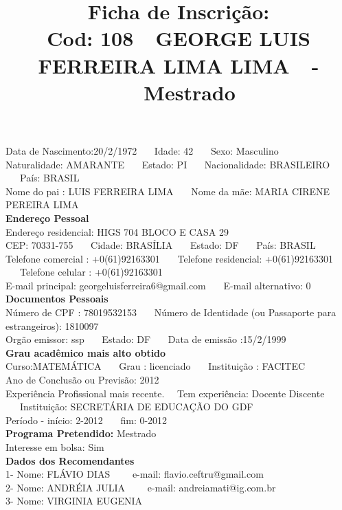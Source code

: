 \documentclass[11pt]{article}
\title{\vspace*{-4cm} Ficha de Inscrição: \\Cod: 108\ \ GEORGE LUIS FERREIRA LIMA LIMA\ \ - \ \ Mestrado 
 }
\date{}
\begin{document}
\maketitle
\vspace*{-1.5cm}
\noindent Data de Nascimento:20/2/1972
\ \ \ Idade: 42   \ \ \ Sexo: Masculino
\\
Naturalidade: AMARANTE  
\ \ \  Estado: PI
\ \ \  Nacionalidade: BRASILEIRO
\ \ \ País: BRASIL
\\        
Nome do pai : LUIS FERREIRA LIMA
\ \ \ Nome da mãe: MARIA CIRENE PEREIRA LIMA          
\\[0.2cm]                     
\textbf{Endereço Pessoal} 
\\ 
\noindent Endereço residencial: HIGS 704 BLOCO E CASA 29
\\
        CEP: 70331-755 
\ \ \ Cidade: BRASÍLIA 
\ \ \ Estado: DF 
\ \ \ País: BRASIL
\\		
		Telefone comercial : +0(61)92163301
\ \ \ Telefone residencial: +0(61)92163301
\ \ \ Telefone celular : +0(61)92163301
\\
E-mail principal: georgeluisferreira6@gmail.com
\ \ \ E-mail alternativo: 0 
\\[0.2cm] 
\textbf{Documentos Pessoais}
\\
\noindent Número de CPF : 78019532153
\ \ \ Número de Identidade (ou Passaporte para estrangeiros): 1810097
\\
Orgão emissor: ssp
\ \ \ Estado: DF
\ \ \ Data de emissão :15/2/1999
\\[0.3cm]
\textbf{Grau acadêmico mais alto obtido}
\\	
Curso:MATEMÁTICA
\ \ \ Grau : licenciado
\ \ \ Instituição : FACITEC
\\			
Ano de Conclusão ou Previsão: 2012
\\ 
Experiência Profissional mais recente. \ \  
Tem experiência: Docente Discente  
\ \ \ Instituição: SECRETÁRIA DE EDUCAÇÃO DO GDF
\\  
Período - início: 2-2012
\ \ \ fim: 0-2012
\\[0.2cm] 
\textbf{Programa Pretendido:} Mestrado\\
Interesse em bolsa: Sim
\\[0.3cm]		
\textbf{Dados dos Recomendantes} 
\\
1- Nome: FLÁVIO DIAS
\ \ \ \  e-mail: flavio.ceftru@gmail.com 
\\
2- Nome: ANDRÉIA JULIA
\ \ \ \ e-mail: andreiamati@ig.com.br
\\
3- Nome: VIRGINIA EUGENIA
\end{document}
